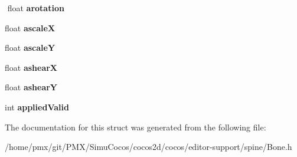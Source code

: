 \begin{DoxyCompactItemize}
$$\mbox{\label{structspBone_a340755e80f75fb013ced5bdb19e84107}} 
float {\bfseries arotation}
\item 
\mbox{\label{structspBone_ae7fbd89641d8e976f8094f8da9d78ed1}} 
float {\bfseries ascaleX}
\item 
\mbox{\label{structspBone_aae3ba955d47810d5721edd3abd10daef}} 
float {\bfseries ascaleY}
\item 
\mbox{\label{structspBone_a7be482377fbfa0580d1ddbf37f92f1c0}} 
float {\bfseries ashearX}
\item 
\mbox{\label{structspBone_acc9576590f5eeb6d75f0aca1ba8f69c7}} 
float {\bfseries ashearY}
\item 
\mbox{\label{structspBone_acd391385137dec7f8fc99ba76f87283b}} 
int {\bfseries applied\+Valid}
\end{DoxyCompactItemize}


The documentation for this struct was generated from the following file\+:\begin{DoxyCompactItemize}
\item 
/home/pmx/git/\+P\+M\+X/\+Simu\+Cocos/cocos2d/cocos/editor-\/support/spine/Bone.\+h\end{DoxyCompactItemize}
